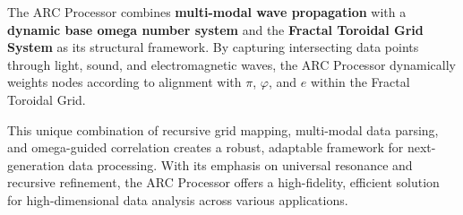 \documentclass{article}
\begin{document}
The ARC Processor combines \textbf{multi-modal wave propagation} with a \textbf{dynamic base omega number system} and the \textbf{Fractal Toroidal Grid System} as its structural framework. By capturing intersecting data points through light, sound, and electromagnetic waves, the ARC Processor dynamically weights nodes according to alignment with $\pi$, $\varphi$, and $e$ within the Fractal Toroidal Grid.

This unique combination of recursive grid mapping, multi-modal data parsing, and omega-guided correlation creates a robust, adaptable framework for next-generation data processing. With its emphasis on universal resonance and recursive refinement, the ARC Processor offers a high-fidelity, efficient solution for high-dimensional data analysis across various applications.
\end{document}
